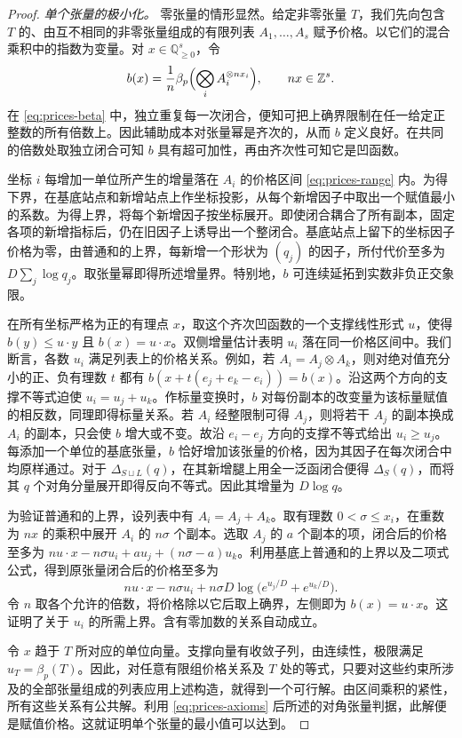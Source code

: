 \begin{proof}
\emph{单个张量的极小化。} 零张量的情形显然。给定非零张量 \(T\)，我们先向包含 \(T\) 的、由互不相同的非零张量组成的有限列表 \(A_1,\ldots,A_s\) 赋予价格。以它们的混合乘积中的指数为变量。对 \(x\in\mathbb Q_{\ge0}^s\)，令
\[
 b(x)=\frac1n\beta_p\Bigl(\bigotimes_i A_i^{\otimes nx_i}\Bigr),
 \qquad nx\in\mathbb Z^s.
\]
在 \eqref{eq:prices-beta} 中，独立重复每一次闭合，便知可把上确界限制在任一给定正整数的所有倍数上。因此辅助成本对张量幂是齐次的，从而 \(b\) 定义良好。在共同的倍数处取独立闭合可知 \(b\) 具有超可加性，再由齐次性可知它是凹函数。

坐标 \(i\) 每增加一单位所产生的增量落在 \(A_i\) 的价格区间 \eqref{eq:prices-range} 内。为得下界，在基底站点和新增站点上作坐标投影，从每个新增因子中取出一个赋值最小的系数。为得上界，将每个新增因子按坐标展开。即使闭合耦合了所有副本，固定各项的新增指标后，仍在旧因子上诱导出一个整闭合。基底站点上留下的坐标因子价格为零，由普通和的上界，每新增一个形状为 \((q_j)\) 的因子，所付代价至多为 \(D\sum_j\log q_j\)。取张量幂即得所述增量界。特别地，\(b\) 可连续延拓到实数非负正交象限。

在所有坐标严格为正的有理点 \(x\)，取这个齐次凹函数的一个支撑线性形式 \(u\)，使得 \(b(y)\le u\cdot y\) 且 \(b(x)=u\cdot x\)。双侧增量估计表明 \(u_i\) 落在同一价格区间中。我们断言，各数 \(u_i\) 满足列表上的价格关系。例如，若 \(A_i=A_j\otimes A_k\)，则对绝对值充分小的正、负有理数 \(t\) 都有 \(b(x+t(e_j+e_k-e_i))=b(x)\)。沿这两个方向的支撑不等式迫使 \(u_i=u_j+u_k\)。作标量变换时，\(b\) 对每份副本的改变量为该标量赋值的相反数，同理即得标量关系。若 \(A_i\) 经整限制可得 \(A_j\)，则将若干 \(A_j\) 的副本换成 \(A_i\) 的副本，只会使 \(b\) 增大或不变。故沿 \(e_i-e_j\) 方向的支撑不等式给出 \(u_i\ge u_j\)。每添加一个单位的基底张量，\(b\) 恰好增加该张量的价格，因为其因子在每次闭合中均原样通过。对于 \(\Delta_{S\sqcup L}(q)\)，在其新增腿上用全一泛函闭合便得 \(\Delta_S(q)\)，而将其 \(q\) 个对角分量展开即得反向不等式。因此其增量为 \(D\log q\)。

为验证普通和的上界，设列表中有 \(A_i=A_j+A_k\)。取有理数 \(0<\sigma\le x_i\)，在重数为 \(nx\) 的乘积中展开 \(A_i\) 的 \(n\sigma\) 个副本。选取 \(A_j\) 的 \(a\) 个副本的项，闭合后的价格至多为 \(n u\cdot x-n\sigma u_i+a u_j+(n\sigma-a)u_k\)。利用基底上普通和的上界以及二项式公式，得到原张量闭合后的价格至多为
\[
 n u\cdot x-n\sigma u_i+
 n\sigma D\log\bigl(e^{u_j/D}+e^{u_k/D}\bigr).
\]
令 \(n\) 取各个允许的倍数，将价格除以它后取上确界，左侧即为 \(b(x)=u\cdot x\)。这证明了关于 \(u_i\) 的所需上界。含有零加数的关系自动成立。

令 \(x\) 趋于 \(T\) 所对应的单位向量。支撑向量有收敛子列，由连续性，极限满足 \(u_T=\beta_p(T)\)。因此，对任意有限组价格关系及 \(T\) 处的等式，只要对这些约束所涉及的全部张量组成的列表应用上述构造，就得到一个可行解。由区间乘积的紧性，所有这些关系有公共解。利用 \eqref{eq:prices-axioms} 后所述的对角张量判据，此解便是赋值价格。这就证明单个张量的最小值可以达到。


\end{proof}
